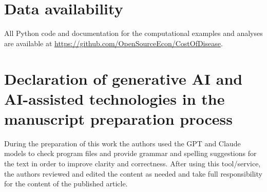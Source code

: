 \documentclass[letterpaper,12pt]{article}
\theoremstyle{definition}
\begin{document}
\section*{Data availability}

All Python code and documentation for the computational examples and analyses are available at \href{https://github.com/OpenSourceEcon/CostOfDisease}{https://github.com/OpenSourceEcon/CostOfDisease}.

\section*{Declaration of generative AI and AI-assisted technologies in the manuscript preparation process}
During the preparation of this work the authors used the GPT and Claude models to check program files and provide grammar and spelling suggestions for the text in order to improve clarity and correctness. After using this tool/service, the authors reviewed and edited the content as needed and take full responsibility for the content of the published article.


\end{document}
